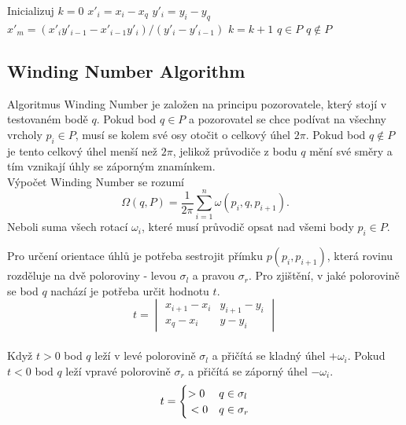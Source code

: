 

\begin{algorithm}
\caption{Ray Crossing ($P = \{p_1, \dots, p_n\}, q$)}
\label{alg:ray_crossing}
\begin{algorithmic}[1]
\State Inicializuj $k = 0$ 
    \State $x'_i = x_i - x_q$
    \State $y'_i = y_i - y_q$
     
        \State $x'_m = (x'_i y'_{i-1} - x'_{i-1} y'_i) / (y'_i - y'_{i-1})$ 
            \State $k = k + 1$
        \EndIf
    \EndIf
\EndFor
{} 
    \State \Return $q \in P$
\Else
    \State \Return $q \notin P$
\EndIf
\end{algorithmic}
\end{algorithm}


\subsection{Winding Number Algorithm}
Algoritmus Winding Number je založen na principu pozorovatele, který stojí v testovaném bodě $q$. 
Pokud bod $q \in P$ a pozorovatel se chce podívat na všechny vrcholy $p_i \in P$, musí se kolem své osy otočit o celkový úhel $2\pi$.
Pokud bod $q \notin P$ je tento celkový úhel menší než $2\pi$, jelikož průvodiče z bodu $q$ mění své směry a tím vznikají úhly se záporným znamínkem. 
\\[2mm]
\newblock
Výpočet Winding Number se rozumí 
\[
\Omega(q, P) = \frac{1}{2\pi} \sum^n_{i=1}\omega(p_i, q, p_{i+1}).
\]
Neboli suma všech rotací $\omega_i$, které musí průvodič opsat nad všemi body $p_i \in P$.

Pro určení orientace úhlů je potřeba sestrojit přímku $p (p_i, p_{i+1})$, která rovinu rozděluje na dvě poloroviny - levou $\sigma_l$ a pravou $\sigma_r$.
Pro zjištění, v jaké polorovině se bod $q$ nachází je potřeba určit hodnotu $t$.
\[t = \begin{vmatrix}
x_{i+1}-x_i & y_{i+1}-y_i \\
x_q-x_i & y-y_i 
\end{vmatrix}
\]
\\[1,5cm]

Když $t>0$ bod $q$ leží v levé polorovině $\sigma_l$ a přičítá se kladný úhel $+ \omega_i$.
Pokud $t<0$ bod $q$ leží vpravé polorovině $\sigma_r$ a přičítá se záporný úhel $-\omega_i$.
\[
  t  = \begin{cases}
    >0 & { q \in \sigma_l } \\
    \newline
    <0 & { q \in \sigma_r}
  \end{cases}
\]

